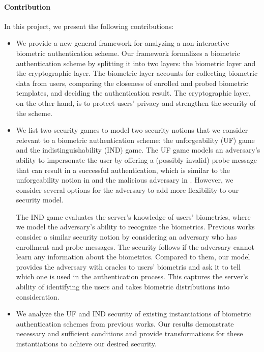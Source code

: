 \paragraph{Contribution}
In this project, we present the following contributions:
\begin{itemize}
	\item We provide a new general framework for analyzing a non-interactive biometric authentication scheme. Our framework formalizes a biometric authentication scheme by splitting it into two layers: the biometric layer and the cryptographic layer. The biometric layer accounts for collecting biometric data from users, comparing the closeness of enrolled and probed biometric templates, and deciding the authentication result. The cryptographic layer, on the other hand, is to protect users' privacy and strengthen the security of the scheme.
	\item We list two security games to model two security notions that we consider relevant to a biometric authentication scheme: the unforgeability (UF) game and the indistinguishability (IND) game. The UF game models an adversary's ability to impersonate the user by offering a (possibly invalid) probe message that can result in a successful authentication, which is similar to the unforgeability notion in \cite{cryptoeprint:2014/394} and the malicious adversary in \cite{cryptoeprint:2023/481}. However, we consider several options for the adversary to add more flexibility to our security model.

	The IND game evaluates the server's knowledge of users' biometrics, where we model the adversary's ability to recognize the biometrics. Previous works \cite{cryptoeprint:2014/394, cryptoeprint:2018/1214, 10.1007/978-3-030-90567-5_33, cryptoeprint:2023/481} consider a similar security notion by considering an adversary who has enrollment and probe messages. The security follows if the adversary cannot learn any information about the biometrics. Compared to them, our model provides the adversary with oracles to users' biometris and ask it to tell which one is used in the authentication process. This captures the server's ability of identifying the users and takes biometric distributions into consideration.
	
	\item We analyze the UF and IND security of existing instantiations of biometric authentication schemes from previous works. Our results demonstrate necessary and sufficient conditions and provide transformations for these instantiations to achieve our desired security.
\end{itemize}

